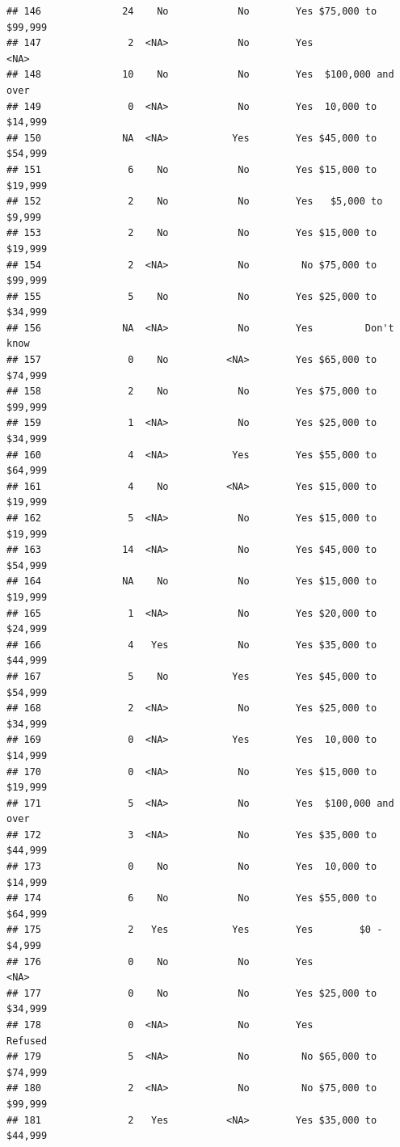 \documentclass[man]{apa6}
\begin{document}
\begin{verbatim}
## 146              24    No            No        Yes $75,000 to $99,999
## 147               2  <NA>            No        Yes               <NA>
## 148              10    No            No        Yes  $100,000 and over
## 149               0  <NA>            No        Yes  10,000 to $14,999
## 150              NA  <NA>           Yes        Yes $45,000 to $54,999
## 151               6    No            No        Yes $15,000 to $19,999
## 152               2    No            No        Yes   $5,000 to $9,999
## 153               2    No            No        Yes $15,000 to $19,999
## 154               2  <NA>            No         No $75,000 to $99,999
## 155               5    No            No        Yes $25,000 to $34,999
## 156              NA  <NA>            No        Yes         Don't know
## 157               0    No          <NA>        Yes $65,000 to $74,999
## 158               2    No            No        Yes $75,000 to $99,999
## 159               1  <NA>            No        Yes $25,000 to $34,999
## 160               4  <NA>           Yes        Yes $55,000 to $64,999
## 161               4    No          <NA>        Yes $15,000 to $19,999
## 162               5  <NA>            No        Yes $15,000 to $19,999
## 163              14  <NA>            No        Yes $45,000 to $54,999
## 164              NA    No            No        Yes $15,000 to $19,999
## 165               1  <NA>            No        Yes $20,000 to $24,999
## 166               4   Yes            No        Yes $35,000 to $44,999
## 167               5    No           Yes        Yes $45,000 to $54,999
## 168               2  <NA>            No        Yes $25,000 to $34,999
## 169               0  <NA>           Yes        Yes  10,000 to $14,999
## 170               0  <NA>            No        Yes $15,000 to $19,999
## 171               5  <NA>            No        Yes  $100,000 and over
## 172               3  <NA>            No        Yes $35,000 to $44,999
## 173               0    No            No        Yes  10,000 to $14,999
## 174               6    No            No        Yes $55,000 to $64,999
## 175               2   Yes           Yes        Yes        $0 - $4,999
## 176               0    No            No        Yes               <NA>
## 177               0    No            No        Yes $25,000 to $34,999
## 178               0  <NA>            No        Yes            Refused
## 179               5  <NA>            No         No $65,000 to $74,999
## 180               2  <NA>            No         No $75,000 to $99,999
## 181               2   Yes          <NA>        Yes $35,000 to $44,999

\end{verbatim}
\end{document}

